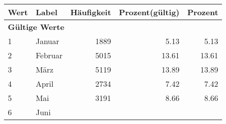      \begin{longtable}{lXrrr}
     \toprule
     \textbf{Wert} & \textbf{Label} & \textbf{Häufigkeit} & \textbf{Prozent(gültig)} & \textbf{Prozent} \\
     \endhead
     \midrule
     \multicolumn{5}{l}{\textbf{Gültige Werte}}\\

     1 &
     \multicolumn{1}{X}{ Januar   } &


       \num{1889} &
       \num[round-mode=places,round-precision=2]{5.13} &
         \num[round-mode=places,round-precision=2]{5.13} \\

     2 &
     \multicolumn{1}{X}{ Februar   } &


       \num{5015} &
       \num[round-mode=places,round-precision=2]{13.61} &
         \num[round-mode=places,round-precision=2]{13.61} \\

     3 &
     \multicolumn{1}{X}{ März   } &


       \num{5119} &
       \num[round-mode=places,round-precision=2]{13.89} &
         \num[round-mode=places,round-precision=2]{13.89} \\

     4 &
     \multicolumn{1}{X}{ April   } &


       \num{2734} &
       \num[round-mode=places,round-precision=2]{7.42} &
         \num[round-mode=places,round-precision=2]{7.42} \\

     5 &
     \multicolumn{1}{X}{ Mai   } &


       \num{3191} &
       \num[round-mode=places,round-precision=2]{8.66} &
         \num[round-mode=places,round-precision=2]{8.66} \\

     6 &
     \multicolumn{1}{X}{ Juni   } &



\end{longtable}
